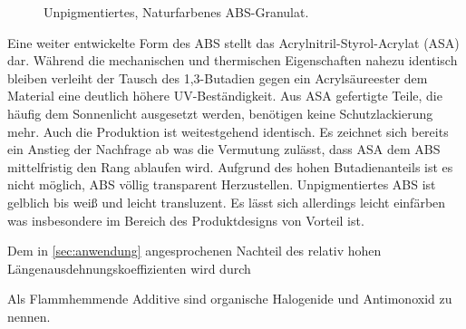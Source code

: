         \begin{figure}%
            \vspace{-\baselineskip}
            \caption[Unpigmentiertes, Naturfarbenes ABS-Granulat]{Unpigmentiertes, Naturfarbenes ABS-Granulat.}%
            \label{fig:virgin ABS}%
        \end{figure}
        Eine weiter entwickelte Form des ABS stellt das Acrylnitril-Styrol-Acrylat (ASA) dar. Während die mechanischen und
        thermischen Eigenschaften nahezu identisch bleiben verleiht der Tausch des 1,3-Butadien gegen ein Acrylsäureester
        dem Material eine deutlich höhere UV-Beständigkeit. Aus ASA gefertigte Teile, die häufig dem Sonnenlicht ausgesetzt
        werden, benötigen keine Schutzlackierung mehr. Auch die Produktion ist weitestgehend identisch. Es zeichnet sich
        bereits ein Anstieg der Nachfrage ab was die Vermutung zulässt, dass ASA dem ABS mittelfristig den Rang ablaufen wird.
        \newpage
        Aufgrund des hohen Butadienanteils ist es nicht möglich, ABS völlig transparent Herzustellen. Unpigmentiertes ABS
        ist gelblich bis weiß und leicht transluzent. Es lässt sich allerdings leicht einfärben was insbesondere im Bereich
        des Produktdesigns von Vorteil ist.

        Dem in \cref{sec:anwendung} angesprochenen Nachteil des relativ hohen Längenausdehnungskoeffizienten wird durch

        Als Flammhemmende Additive sind organische Halogenide und Antimonoxid zu nennen.